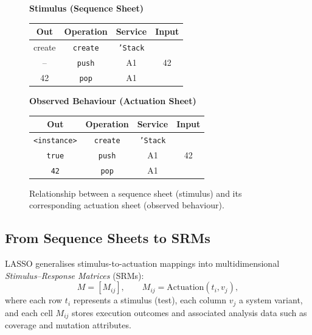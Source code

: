 \begin{figure}[H]
  \centering
  \begin{minipage}[t]{0.45\textwidth}
    \centering
    \textbf{Stimulus (Sequence Sheet)}\\[3pt]
    \begin{tabular}{c|ccc}
      \textbf{Out} & \textbf{Operation} & \textbf{Service} & \textbf{Input} \\
      \hline
      create & \texttt{create} & \texttt{'Stack} & \\
      -- & \texttt{push} & A1 & 42 \\
      42 & \texttt{pop} & A1 & \\
    \end{tabular}
  \end{minipage}
  \hfill
  \begin{minipage}[t]{0.45\textwidth}
    \centering
    \textbf{Observed Behaviour (Actuation Sheet)}\\[3pt]
    \begin{tabular}{c|ccc}
      \textbf{Out} & \textbf{Operation} & \textbf{Service} & \textbf{Input} \\
      \hline
      \texttt{<instance>} & \texttt{create} & \texttt{'Stack} & \\
      \texttt{true} & \texttt{push} & A1 & 42 \\
      \texttt{42} & \texttt{pop} & A1 & \\
    \end{tabular}
  \end{minipage}
  \caption{Relationship between a sequence sheet (stimulus) and its corresponding actuation sheet (observed behaviour).}
  \label{fig:seq-act-sheet}
\end{figure}

\subsection{From Sequence Sheets to SRMs}

LASSO generalises stimulus-to-actuation mappings into multidimensional \emph{Stimulus--Response Matrices} (SRMs):
\[
M = [M_{ij}], \qquad M_{ij} = \text{Actuation}(t_i, v_j),
\]
where each row $t_i$ represents a stimulus (test), each column $v_j$ a system variant, and each cell $M_{ij}$ stores execution outcomes and associated analysis data such as coverage and mutation attributes.

